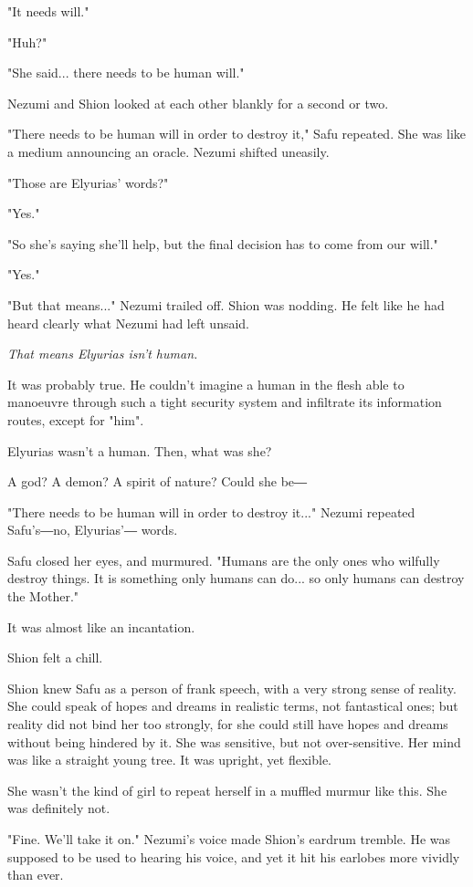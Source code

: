 "It needs will."

"Huh?"

"She said... there needs to be human will."

Nezumi and Shion looked at each other blankly for a second or two.

"There needs to be human will in order to destroy it," Safu repeated.
She was like a medium announcing an oracle. Nezumi shifted uneasily.

"Those are Elyurias' words?"

"Yes."

"So she's saying she'll help, but the final decision has to come from
our will."

"Yes."

"But that means..." Nezumi trailed off. Shion was nodding. He felt like
he had heard clearly what Nezumi had left unsaid.

\emph{That means Elyurias isn't human.}

It was probably true. He couldn't imagine a human in the flesh able to
manoeuvre through such a tight security system and infiltrate its
information routes, except for "him".

Elyurias wasn't a human. Then, what was she?

A god? A demon? A spirit of nature? Could she be―

"There needs to be human will in order to destroy it..." Nezumi repeated
Safu's―no, Elyurias'― words.

Safu closed her eyes, and murmured. "Humans are the only ones who
wilfully destroy things. It is something only humans can do... so only
humans can destroy the Mother."

It was almost like an incantation.

Shion felt a chill.

Shion knew Safu as a person of frank speech, with a very strong sense of
reality. She could speak of hopes and dreams in realistic terms, not
fantastical ones; but reality did not bind her too strongly, for she
could still have hopes and dreams without being hindered by it. She was
sensitive, but not over-sensitive. Her mind was like a straight young
tree. It was upright, yet flexible.

She wasn't the kind of girl to repeat herself in a muffled murmur like
this. She was definitely not.

"Fine. We'll take it on." Nezumi's voice made Shion's eardrum tremble.
He was supposed to be used to hearing his voice, and yet it hit his
earlobes more vividly than ever.


